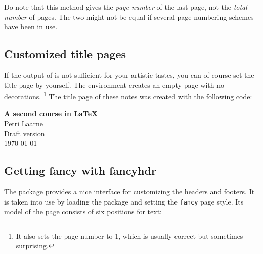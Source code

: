 Do note that this method gives the \emph{page number} of the last page,
not the \emph{total number} of pages.
The two might not be equal if several page numbering schemes have been in use.


%
%
\subsection{Customized title pages}

If the output of  is not sufficient for your artistic tastes,
you can of course set the title page by yourself.
The  environment creates an empty page with no decorations.%
\footnote{It also sets the page number to 1, which is usually correct but sometimes surprising.}
The title page of these notes was created with the following code:\label{ex:titlepage}
%
\begin{ExampleCode}
\begin{titlepage}

\hrulefill

\begin{flushright}
\textbf{\LARGE A second course in \LaTeX}\\[1em]
\Large Petri Laarne\\[1em]
Draft version\\
\today
\end{flushright}

\hrulefill

\end{titlepage}
\end{ExampleCode}


%
%
\subsection{Getting fancy with \textsf{fancyhdr}}

The  package provides a nice interface for customizing the headers and footers.
It is taken into use by loading the package and setting the \verb|fancy| page style.
Its model of the page consists of six positions for text:
%
\begin{center}
\end{center}

